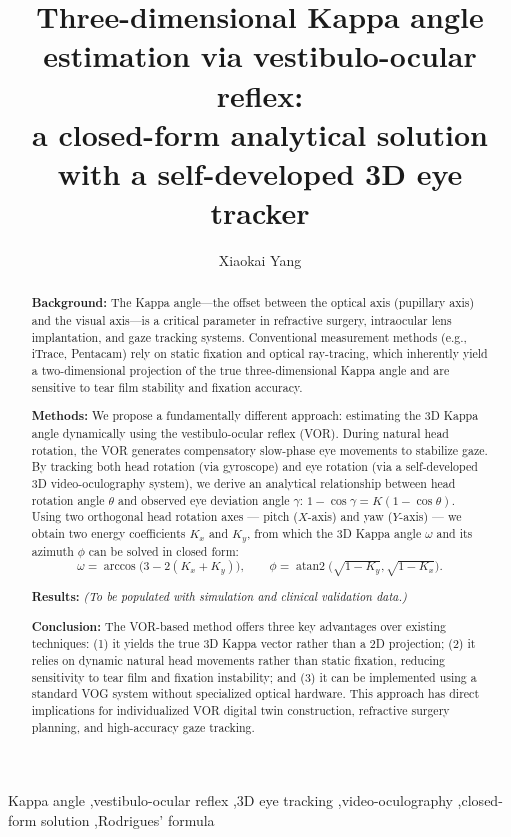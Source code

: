\documentclass[review,numbers,sort&compress]{elsarticle}
\begin{document}
\begin{frontmatter}

\title{Three-dimensional Kappa angle estimation via vestibulo-ocular reflex:\\a closed-form analytical solution with a self-developed 3D eye tracker}

\author[1]{Xiaokai Yang}


\begin{abstract}
\textbf{Background:} The Kappa angle---the offset between the optical axis (pupillary axis) and the visual axis---is a critical parameter in refractive surgery, intraocular lens implantation, and gaze tracking systems. Conventional measurement methods (e.g., iTrace, Pentacam) rely on static fixation and optical ray-tracing, which inherently yield a two-dimensional projection of the true three-dimensional Kappa angle and are sensitive to tear film stability and fixation accuracy.

\textbf{Methods:} We propose a fundamentally different approach: estimating the 3D Kappa angle dynamically using the vestibulo-ocular reflex (VOR). During natural head rotation, the VOR generates compensatory slow-phase eye movements to stabilize gaze. By tracking both head rotation (via gyroscope) and eye rotation (via a self-developed 3D video-oculography system), we derive an analytical relationship between head rotation angle $\theta$ and observed eye deviation angle $\gamma$: $1-\cos\gamma = K(1-\cos\theta)$. Using two orthogonal head rotation axes --- pitch ($X$-axis) and yaw ($Y$-axis) --- we obtain two energy coefficients $K_x$ and $K_y$, from which the 3D Kappa angle $\omega$ and its azimuth $\phi$ can be solved in closed form:
\[
\omega = \arccos\bigl(3-2(K_x+K_y)\bigr),\qquad
\phi = \operatorname{atan2}\bigl(\sqrt{1-K_y},\sqrt{1-K_x}\bigr).
\]

\textbf{Results:} \textit{(To be populated with simulation and clinical validation data.)}

\textbf{Conclusion:} The VOR-based method offers three key advantages over existing techniques: (1) it yields the true 3D Kappa vector rather than a 2D projection; (2) it relies on dynamic natural head movements rather than static fixation, reducing sensitivity to tear film and fixation instability; and (3) it can be implemented using a standard VOG system without specialized optical hardware. This approach has direct implications for individualized VOR digital twin construction, refractive surgery planning, and high-accuracy gaze tracking.
\end{abstract}

\begin{keyword}
Kappa angle \sep vestibulo-ocular reflex \sep 3D eye tracking \sep video-oculography \sep closed-form solution \sep Rodrigues' formula
\end{keyword}

\end{frontmatter}
\end{document}
